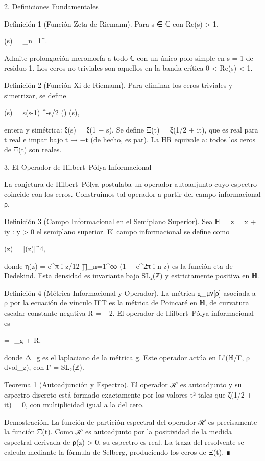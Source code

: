 \documentclass[12pt,a4paper]{book}
\begin{document}
2. Definiciones Fundamentales

Definición 1 (Función Zeta de Riemann). Para s ∈ ℂ con Re(s) > 1,

\zeta(s) = \sum_{n=1}^\infty {}.

Admite prolongación meromorfa a todo ℂ con un único polo simple en s = 1 de residuo 1. Los ceros no triviales son aquellos en la banda crítica 0 < Re(s) < 1.

Definición 2 (Función Xi de Riemann). Para eliminar los ceros triviales y simetrizar, se define

\xi(s) =  s(s-1) \pi^{-s/2} \Gamma\!\left(\right) \zeta(s),

entera y simétrica: ξ(s) = ξ(1 − s). Se define Ξ(t) = ξ(1/2 + it), que es real para t real e impar bajo t → −t (de hecho, es par). La HR equivale a: todos los ceros de Ξ(t) son reales.

3. El Operador de Hilbert–Pólya Informacional

La conjetura de Hilbert–Pólya postulaba un operador autoadjunto cuyo espectro coincide con los ceros. Construimos tal operador a partir del campo informacional ρ.

Definición 3 (Campo Informacional en el Semiplano Superior). Sea ℍ = {z = x + iy : y > 0} el semiplano superior. El campo informacional se define como

\rho(z) = |\eta(z)|^4,

donde η(z) = e^{π i z/12} ∏_{n=1}^∞ (1 − e^{2π i n z}) es la función eta de Dedekind. Esta densidad es invariante bajo SL₂(ℤ) y estrictamente positiva en ℍ.

Definición 4 (Métrica Informacional y Operador). La métrica g_{μν}[ρ] asociada a ρ por la ecuación de vínculo IFT es la métrica de Poincaré en ℍ, de curvatura escalar constante negativa R = −2. El operador de Hilbert–Pólya informacional es

 = -\Delta_{g} +  R,

donde Δ_g es el laplaciano de la métrica g. Este operador actúa en L²(ℍ/Γ, ρ dvol_g), con Γ = SL₂(ℤ).

Teorema 1 (Autoadjunción y Espectro). El operador ℋ es autoadjunto y su espectro discreto está formado exactamente por los valores t² tales que ζ(1/2 + it) = 0, con multiplicidad igual a la del cero.

Demostración. La función de partición espectral del operador ℋ es precisamente la función Ξ(t). Como ℋ es autoadjunto por la positividad de la medida espectral derivada de ρ(z) > 0, su espectro es real. La traza del resolvente se calcula mediante la fórmula de Selberg, produciendo los ceros de Ξ(t). ∎
\end{document}
